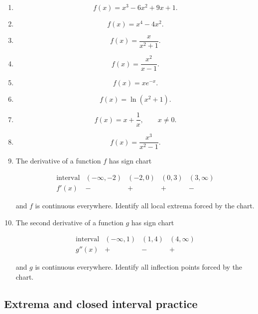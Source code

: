 \begin{enumerate}
\item

\[
f(x)=x^3-6x^2+9x+1.
\]

\item

\[
f(x)=x^4-4x^2.
\]

\item

\[
f(x)=\frac{x}{x^2+1}.
\]

\item

\[
f(x)=\frac{x^2}{x-1}.
\]

\item

\[
f(x)=xe^{-x}.
\]

\item

\[
f(x)=\ln(x^2+1).
\]

\item

\[
f(x)=x+\frac1x,
\qquad x\neq0.
\]

\item

\[
f(x)=\frac{x^3}{x^2-1}.
\]

\item The derivative of a function \(f\) has sign chart

\[
\begin{array}{c|cccc}
\text{interval} & (-\infty,-2) & (-2,0) & (0,3) & (3,\infty) \\ \hline
f'(x) & - & + & + & -
\end{array}
\]

and \(f\) is continuous everywhere.  Identify all local extrema forced by the chart.

\item The second derivative of a function \(g\) has sign chart

\[
\begin{array}{c|ccc}
\text{interval} & (-\infty,1) & (1,4) & (4,\infty) \\ \hline
g''(x) & + & - & +
\end{array}
\]

and \(g\) is continuous everywhere.  Identify all inflection points forced by the chart.
\end{enumerate}

\subsection{Extrema and closed interval practice}
\label{subsec:chapter-6-extrema-practice}

